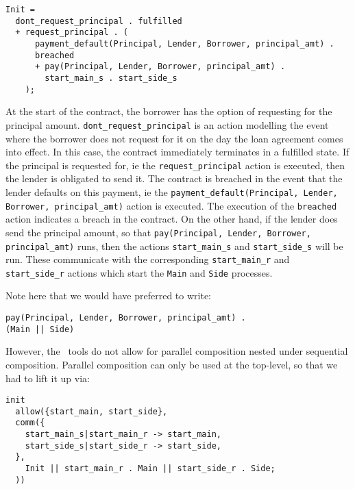 \documentclass{article}
\begin{document}


\begin{lstlisting}
Init =
  dont_request_principal . fulfilled
  + request_principal . (
      payment_default(Principal, Lender, Borrower, principal_amt) .
      breached
      + pay(Principal, Lender, Borrower, principal_amt) .
        start_main_s . start_side_s
    );
\end{lstlisting}

At the start of the contract, the borrower has the option of requesting for
the principal amount.
\texttt{dont\_request\_principal} is an action modelling the event where the
borrower does not request for it on the day the loan agreement comes into
effect.
In this case, the contract immediately terminates in a fulfilled state.
If the principal is requested for, ie the \texttt{request\_principal} action
is executed, then the lender is obligated to send it.
The contract is breached in the event that the lender defaults on this payment,
ie the \texttt{payment\_default(Principal, Lender, Borrower, principal\_amt)}
action is executed.
The execution of the \texttt{breached} action indicates a breach in the contract.
On the other hand, if the lender does send the principal amount,
so that \texttt{pay(Principal, Lender, Borrower, principal\_amt)} runs,
then the actions \texttt{start\_main\_s} and \texttt{start\_side\_s} will be run.
These communicate with the corresponding \texttt{start\_main\_r} and
\texttt{start\_side\_r} actions which start the \texttt{Main} and
\texttt{Side} processes.

Note here that we would have preferred to write:

\begin{lstlisting}
pay(Principal, Lender, Borrower, principal_amt) .
(Main || Side)
\end{lstlisting}

However, the \mcrl \, tools do not allow for parallel composition nested under
sequential composition.
Parallel composition can only be used at the top-level, so that we had to lift
it up via:

\begin{lstlisting}[label=init1, caption=Top-level process version 1]
init
  allow({start_main, start_side},
  comm({
    start_main_s|start_main_r -> start_main,
    start_side_s|start_side_r -> start_side,
  },
    Init || start_main_r . Main || start_side_r . Side;
  ))
\end{lstlisting}
\end{document}
